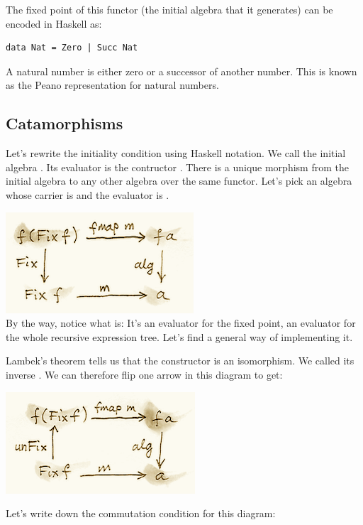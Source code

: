 The fixed point of this functor (the initial algebra that it generates)
can be encoded in Haskell as:

\begin{verbatim}
data Nat = Zero | Succ Nat
\end{verbatim}

A natural number is either zero or a successor of another number. This
is known as the Peano representation for natural numbers.

\subsection{Catamorphisms}\label{catamorphisms}

Let's rewrite the initiality condition using Haskell notation. We call
the initial algebra . Its evaluator is the contructor
. There is a unique morphism  from the initial
algebra to any other algebra over the same functor. Let's pick an
algebra whose carrier is  and the evaluator is .

\includegraphics{images/alg5.png}\\
By the way, notice what  is: It's an evaluator for the fixed
point, an evaluator for the whole recursive expression tree. Let's find
a general way of implementing it.

Lambek's theorem tells us that the constructor  is an
isomorphism. We called its inverse . We can therefore flip
one arrow in this diagram to get:

\includegraphics{images/alg6.png}

Let's write down the commutation condition for this diagram:

